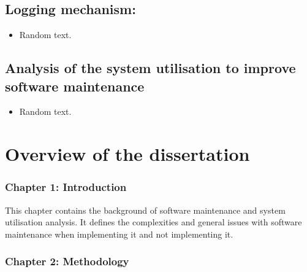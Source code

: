 \subsection{Logging mechanism:}
\begin{itemize}
	\item Random text.
\end{itemize}

\subsection{Analysis of the system utilisation to improve software maintenance}
\begin{itemize}
	\item Random text.
\end{itemize}

\section{Overview of the dissertation}
\subsubsection{Chapter 1: Introduction}
This chapter contains the background of software maintenance and system utilisation analysis. It defines the complexities and general issues with software maintenance when implementing it and not implementing it.
\subsubsection{Chapter 2: Methodology}